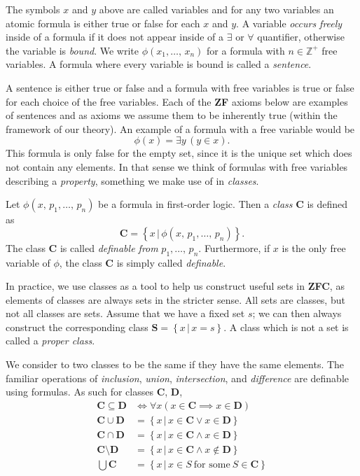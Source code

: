 \documentclass[../../main.tex]{subfiles}
\begin{document}
The symbols $x$ and $y$ above are called variables and for any two variables an atomic formula is either true or false for each $x$ and $y$.
A variable \textit{occurs freely} inside of a formula if it does not appear inside of a $\exists$ or $\forall$ quantifier, otherwise the variable is \textit{bound}.
We write $\phi\left(x_1,\ldots,\, x_n\right)$ for a formula with $n \in \mathbb{Z}^+$ free variables.
A formula where every variable is bound is called a \textit{sentence}. \cite[pp.10-11]{Mar02}

A sentence is either true or false and a formula with free variables is true or false for each choice of the free variables.
Each of the \textbf{ZF} axioms below are examples of sentences and as axioms we assume them to be inherently true (within the framework of our theory).
An example of a formula with a free variable would be $$\phi(x) = \exists y \, \left(y \in x\right).$$ 
This formula is only false for the empty set, since it is the unique set which does not contain any elements.
In that sense we think of formulas with free variables describing a \textit{property}, something we make use of in \textit{classes}.

\begin{definition}[Class]
    Let $\phi\left(x,\, p_1,\ldots,\, p_n\right)$ be a formula in first-order logic.
    Then a \textit{class} $\mathbf{C}$ is defined as
    $$\mathbf{C} = \left\{x \,\vert\, \phi\left(x,\, p_1,\ldots,\, p_n\right)\right\}.$$
    The class $\mathbf{C}$ is called \textit{definable from} $p_1,\ldots,\, p_n$.
    Furthermore, if $x$ is the only free variable of $\phi$, the class $\mathbf{C}$ is simply called \textit{definable}. \cite[p.3]{Jec78}
\end{definition}

In practice, we use classes as a tool to help us construct useful sets in \textbf{ZFC}, as elements of classes are always sets in the stricter sense.
All sets are classes, but not all classes are sets.
Assume that we have a fixed set $s$; we can then always construct the corresponding class $\mathbf{S} = \left\{x \,\vert\, x = s\right\}$.
A class which is not a set is called a \textit{proper class}.

We consider to two classes to be the same if they have the same elements.
The familiar operations of \textit{inclusion}, \textit{union}, \textit{intersection}, and \textit{difference} are definable using formulas.
As such for classes $\mathbf{C}$, $\mathbf{D}$,
\begin{align*}
    \mathbf{C} \subseteq \mathbf{D} &\iff \forall x \left(x \in \mathbf{C} \implies x \in \mathbf{D}\right) \\
    \mathbf{C} \cup \mathbf{D} &= \left\{x \,\vert\, x \in \mathbf{C} \vee x \in \mathbf{D}\right\} \\
    \mathbf{C} \cap \mathbf{D} &= \left\{x \,\vert\, x \in \mathbf{C} \wedge x \in \mathbf{D}\right\} \\ 
    \mathbf{C} \setminus \mathbf{D} &= \left\{x \,\vert\, x \in \mathbf{C} \wedge x \not\in \mathbf{D}\right\} \\
    \bigcup \mathbf{C} &= \left\{x \,\vert\, x \in S \ \text{for some}\ S \in \mathbf{C}\right\}
\end{align*}\cite[pp.3-4]{Jec78}
\end{document}
